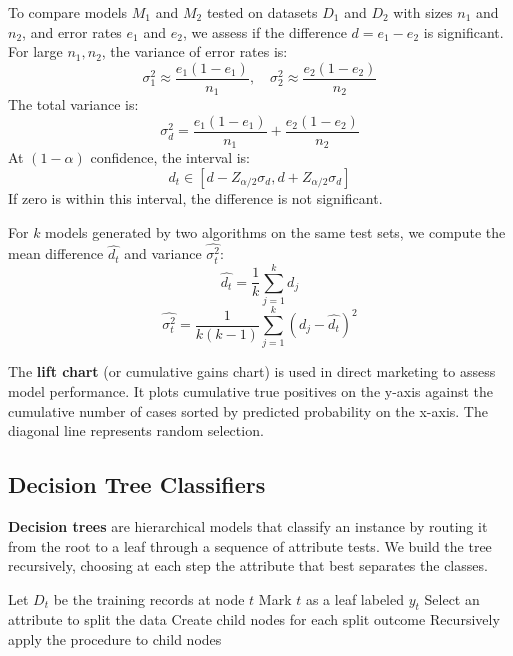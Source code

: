 To compare models $M_1$ and $M_2$ tested on datasets $D_1$ and $D_2$ with sizes $n_1$ and $n_2$, and error rates $e_1$ and $e_2$, we assess if the difference $d = e_1 - e_2$ is significant. For large $n_1, n_2$, the variance of error rates is:
\begin{equation}
\sigma_1^2 \approx \frac{e_1(1-e_1)}{n_1}, \quad \sigma_2^2 \approx \frac{e_2(1-e_2)}{n_2}
\end{equation}
The total variance is:
\begin{equation}
\sigma_d^2 = \frac{e_1(1-e_1)}{n_1} + \frac{e_2(1-e_2)}{n_2}
\end{equation}
At $(1-\alpha)$ confidence, the interval is:
\begin{equation}
d_t \in \left[d - Z_{\alpha/2}\sigma_d, d + Z_{\alpha/2}\sigma_d\right]
\end{equation}
If zero is within this interval, the difference is not significant.

For $k$ models generated by two algorithms on the same test sets, we compute the mean difference $\hat{d_t}$ and variance $\hat{\sigma_t^2}$:
\begin{equation}
\hat{d_t} = \frac{1}{k}\sum_{j=1}^{k} d_j
\end{equation}
\begin{equation}
\hat{\sigma_t^2} = \frac{1}{k(k-1)}\sum_{j=1}^{k} (d_j - \hat{d_t})^2
\end{equation}

\begin{definition}
The \textbf{lift chart} (or cumulative gains chart) is used in direct marketing to assess model performance. It plots cumulative true positives on the y-axis against the cumulative number of cases sorted by predicted probability on the x-axis. The diagonal line represents random selection.
\end{definition}

\subsection{Decision Tree Classifiers}

\textbf{Decision trees} are hierarchical models that classify an instance by routing it from the root to a leaf through a sequence of attribute tests. We build the tree recursively, choosing at each step the attribute that best separates the classes.

\begin{algorithm}
\caption{Hunt's Algorithm for Decision Tree Induction}
\begin{algorithmic}[1]
\State Let $D_t$ be the training records at node $t$
    \State Mark $t$ as a leaf labeled $y_t$
    \State Select an attribute to split the data
    \State Create child nodes for each split outcome
    \State Recursively apply the procedure to child nodes
\EndIf
\EndProcedure
\end{algorithmic}
\end{algorithm}


